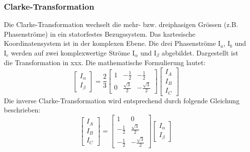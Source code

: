 \subsubsection*{Clarke-Transformation}
Die Clarke-Transformation wechselt die mehr- bzw. dreiphasigen Grössen (z.B. Phasenströme) in ein statorfestes Bezugssystem. Das kartesische Koordinatensystem ist in der komplexen Ebene. Die drei Phasenströme I$_{a}$, I$_{b}$ und I$_{c}$ werden auf zwei komplexwertige Ströme I$_{\alpha}$ und I$_{\beta}$ abgebildet. Dargestellt ist die Transformation in xxx.
Die mathematische Formulierung lautet:
\begin{equation}\label{ClarkeTrafo}
\left[
	\begin{array}{c}
	I_\alpha \\ 
	I_\beta
	\end{array} 
\right]
= \frac{2}{3}
\left[
	\begin{array}{ccc}
	1 & -\frac{1}{2} & -\frac 12 \\ 
	0 & \frac{\sqrt{3}}{2} & -\frac{\sqrt{3}}{2}
	\end{array} 
\right] 
\left[
	\begin{array}{c}
	I_A \\ 
	I_B \\
	I_C
	\end{array} 
\right]
\end{equation}
Die inverse Clarke-Transformation wird entsprechend durch folgende Gleichung beschrieben:
\begin{equation}\label{invClarkeTrafo}
\left[
\begin{array}{c}
	I_A \\ 
	I_B \\
	I_C
\end{array} 
\right]
= 
\left[
	\begin{array}{cc}
	1 & 0 \\
	-\frac{1}{2} & \frac{\sqrt{3}}{2} \\
	-\frac 12  & -\frac{\sqrt{3}}{2}
	\end{array} 
\right] 
\left[
	\begin{array}{c}
	I_\alpha \\ 
	I_\beta
	\end{array} 
\right]
\end{equation}


